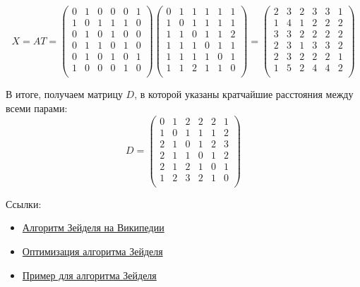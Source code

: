 \begin{example}
  $$ X = AT =
    \begin{pmatrix}
    0 & 1 & 0 & 0 & 0 & 1 \\
    1 & 0 & 1 & 1 & 1 & 0 \\
    0 & 1 & 0 & 1 & 0 & 0 \\
    0 & 1 & 1 & 0 & 1 & 0 \\
    0 & 1 & 0 & 1 & 0 & 1 \\
    1 & 0 & 0 & 0 & 1 & 0 \\
    \end{pmatrix}
    \begin{pmatrix}
    0 & 1 & 1 & 1 & 1 & 1 \\
    1 & 0 & 1 & 1 & 1 & 1 \\
    1 & 1 & 0 & 1 & 1 & 2 \\
    1 & 1 & 1 & 0 & 1 & 1 \\
    1 & 1 & 1 & 1 & 0 & 1 \\
    1 & 1 & 2 & 1 & 1 & 0 \\
    \end{pmatrix}
    =
    \begin{pmatrix}
    2 & 3 & 2 & 3 & 3 & 1 \\
    1 & 4 & 1 & 2 & 2 & 2 \\
    3 & 3 & 2 & 2 & 2 & 2 \\
    2 & 3 & 1 & 3 & 3 & 2 \\
    2 & 3 & 2 & 2 & 2 & 1 \\
    1 & 5 & 2 & 4 & 4 & 2 \\
    \end{pmatrix}
  $$
  
  В итоге, получаем матрицу $D$, в которой указаны кратчайшие расстояния между всеми парами:
  $$ D =
  \begin{pmatrix}
    0 & 1 & 2 & 2 & 2 & 1 \\
    1 & 0 & 1 & 1 & 1 & 2 \\
    2 & 1 & 0 & 1 & 2 & 3 \\
    2 & 1 & 1 & 0 & 1 & 2 \\
    2 & 1 & 2 & 1 & 0 & 1 \\
    1 & 2 & 3 & 2 & 1 & 0 \\
    \end{pmatrix}
  $$
  
\end{example}

Ссылки:
\begin{itemize}
\item \href{https://en.wikipedia.org/wiki/Seidel's_algorithm}{Алгоритм Зейделя на Википедии}
\item \href{https://scholar.google.com/scholar?cluster=2767762525361395298}{Оптимизация алгоритма Зейделя}
\item \href{http://math.mit.edu/~rothvoss/18.304.1PM/Presentations/2-Chandler-slideslect2.pdf}{Пример для алгоритма Зейделя}
\end{itemize}

